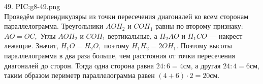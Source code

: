 49. {{PIC:g8-49.png}}\\
Проведём перпендикуляры из точки пересечения диагоналей ко всем сторонам параллелограмма. Треугольники $AOH_2$ и $COH_1$ равны по второму признаку: $AO=OC,$ Углы $AOH_2$ и $COH_1$ вертикальные, а $H_2AO$ и $H_1CO$ --- накрест лежащие. Значит, $H_1O=H_2O,$ поэтому $H_1H_2=2OH_1.$ Поэтому высоты параллелограмма в два раза больше, чем расстояния от точки пересечения диагоналей до сторон. Тогда одна сторона равна $24:6=4$см, а другая $24:4=6$см, таким образом периметр параллелограмма равен $(4+6)\cdot2=20$см.\\
